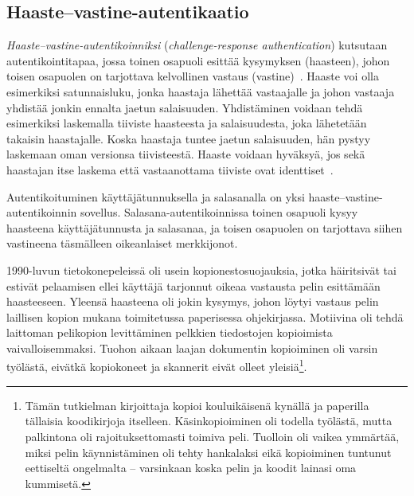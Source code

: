 \documentclass[finnish,gradu]{tktltiki}
\begin{document}


  \subsection{Haaste--vastine-autentikaatio} %
  \label{sub:haaste_vastine_autentikaatio}

  \emph{Haaste--vastine-autentikoinniksi} (\emph{challenge-response authentication}) kutsutaan autentikointitapaa, jossa toinen osapuoli esittää kysymyksen (haasteen), johon toisen osapuolen on tarjottava kelvollinen vastaus (vastine)~\cite{NIST_SP800-63-1}. Haaste voi olla esimerkiksi satunnaisluku, jonka haastaja lähettää vastaajalle ja johon vastaaja yhdistää jonkin ennalta jaetun salaisuuden. Yhdistäminen voidaan tehdä esimerkiksi laskemalla tiiviste haasteesta ja salaisuudesta, joka lähetetään takaisin haastajalle. Koska haastaja tuntee jaetun salaisuuden, hän pystyy laskemaan oman versionsa tiivisteestä. Haaste voidaan hyväksyä, jos sekä haastajan itse laskema että vastaanottama tiiviste ovat identtiset~\cite{NIST_SP800-63-1}.

  Autentikoituminen käyttäjätunnuksella ja salasanalla on yksi haaste--vastine-autentikoinnin sovellus. Salasana-autentikoinnissa toinen osapuoli kysyy haasteena käyttäjätunnusta ja salasanaa, ja toisen osapuolen on tarjottava siihen vastineena täsmälleen oikeanlaiset merkkijonot.

  1990-luvun tietokonepeleissä oli usein kopionestosuojauksia, jotka häiritsivät tai estivät pelaamisen ellei käyttäjä tarjonnut oikeaa vastausta pelin esittämään haasteeseen. Yleensä haasteena oli jokin kysymys, johon löytyi vastaus pelin laillisen kopion mukana toimitetussa paperisessa ohjekirjassa. Motiivina oli tehdä laittoman pelikopion levittäminen pelkkien tiedostojen kopioimista vaivalloisemmaksi. Tuohon aikaan laajan dokumentin kopioiminen oli varsin työlästä, eivätkä kopiokoneet ja skannerit eivät olleet yleisiä\footnote{Tämän tutkielman kirjoittaja kopioi kouluikäisenä kynällä ja paperilla tällaisia koodikirjoja itselleen. Käsinkopioiminen oli todella työlästä, mutta palkintona oli rajoituksettomasti toimiva peli. Tuolloin oli vaikea ymmärtää, miksi pelin käynnistäminen oli tehty hankalaksi eikä kopioiminen tuntunut eettiseltä ongelmalta -- varsinkaan koska pelin ja koodit lainasi oma kummisetä.}.
\end{document}

